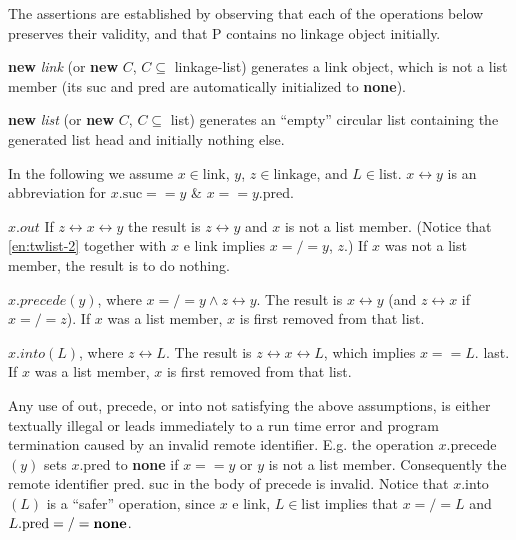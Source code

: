 The assertions are established by observing that each of the operations
below preserves their validity, and that P contains no linkage object initially.

\noindent
\textbf{new} \textit{link} (or \textbf{new} $C$, $C \subseteq$ linkage-list) generates a link object, which is not a list member (its suc and pred are automatically initialized to \textbf{none}).

\noindent
\textbf{new} \textit{list} (or \textbf{new} $C$, $C \subseteq$ list) generates an ``empty'' circular list containing the generated list head and initially nothing else.

\noindent
In the following we assume $x \in \text{link}$, $y$, $z \in \text{linkage}$, and $L \in \text{list}$. $x \leftrightarrow y$ is an abbreviation for $x.\text{suc} == y$ \& $x == y$.pred.

\noindent
$x.out$ If $z \leftrightarrow x \leftrightarrow y$ the result is $z \leftrightarrow y$ and $x$ is not a list member. (Notice that \ref{en:twlist-2} together with $x$ e link implies $x =/= y$, $z$.) If $x$ was not a list member, the result is to do nothing.

\noindent
$x.precede(y)$, where $x =/= y \land z \leftrightarrow y$. The result is $x \leftrightarrow y$ (and $z \leftrightarrow x$ if $x =/= z$). If $x$ was a list member, $x$ is first removed from that list.

\noindent
$x.into(L)$, where $z \leftrightarrow L$. The result is $z \leftrightarrow x \leftrightarrow L$, which implies $x == L$. last. If $x$ was a list member, $x$ is first removed from that list.

Any use of out, precede, or into not satisfying the above assumptions, is either textually illegal or leads immediately to a run time error and program termination caused by an invalid remote identifier. E.g. the operation $x$.precede$(y)$ sets $x$.pred to \textbf{none} if $x == y$ or $y$ is not a list member. Consequently the remote identifier pred. suc in the body of precede is invalid. Notice that $x$.into$(L)$ is a ``safer'' operation, since $x$ e link, $L \in \text{list}$ implies that $x =/= L$ and $L.\text{pred} =/= \text{\textbf{none}}$.


